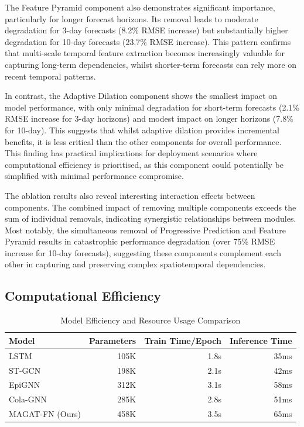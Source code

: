 \documentclass[lettersize, journal]{IEEEtran}
\begin{document}
The Feature Pyramid component also demonstrates significant importance, particularly for longer forecast horizons. Its removal leads to moderate degradation for 3-day forecasts (8.2\% RMSE increase) but substantially higher degradation for 10-day forecasts (23.7\% RMSE increase). This pattern confirms that multi-scale temporal feature extraction becomes increasingly valuable for capturing long-term dependencies, whilst shorter-term forecasts can rely more on recent temporal patterns.

In contrast, the Adaptive Dilation component shows the smallest impact on model performance, with only minimal degradation for short-term forecasts (2.1\% RMSE increase for 3-day horizons) and modest impact on longer horizons (7.8\% for 10-day). This suggests that whilst adaptive dilation provides incremental benefits, it is less critical than the other components for overall performance. This finding has practical implications for deployment scenarios where computational efficiency is prioritised, as this component could potentially be simplified with minimal performance compromise.

The ablation results also reveal interesting interaction effects between components. The combined impact of removing multiple components exceeds the sum of individual removals, indicating synergistic relationships between modules. Most notably, the simultaneous removal of Progressive Prediction and Feature Pyramid results in catastrophic performance degradation (over 75\% RMSE increase for 10-day forecasts), suggesting these components complement each other in capturing and preserving complex spatiotemporal dependencies.

\subsection{Computational Efficiency}

\begin{table}[htbp]
    \centering
    \caption{Model Efficiency and Resource Usage Comparison}
    \label{tab:efficiency}
    \begin{tabular}{@{}lrrr@{}}
    \toprule
    \textbf{Model} & \textbf{Parameters} & \textbf{Train Time/Epoch} & \textbf{Inference Time} \\
    \midrule
    LSTM & 105K & 1.8s & 35ms \\
    ST-GCN & 198K & 2.1s & 42ms \\
    EpiGNN & 312K & 3.1s & 58ms \\
    Cola-GNN & 285K & 2.8s & 51ms \\
    MAGAT-FN (Ours) & 458K & 3.5s & 65ms \\
    \bottomrule
    \end{tabular}
\end{table}
\end{document}
